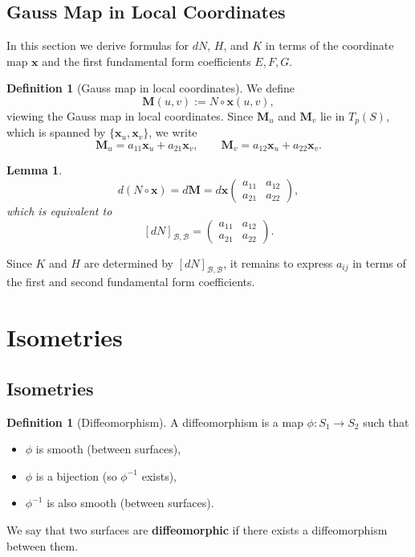 \documentclass[10pt, a4paper]{article}
\theoremstyle{plain}
\newtheorem{lemma}[theorem]{Lemma}
\theoremstyle{definition}
\newtheorem{definition}[theorem]{Definition}
\theoremstyle{remark}
\begin{document}
\subsection{Gauss Map in Local Coordinates}

In this section we derive formulas for $dN$, $H$, and $K$ in terms of the coordinate map
$\mathbf{x}$ and the first fundamental form coefficients $E, F, G$.

\begin{definition}[Gauss map in local coordinates]
  We define
  \[
    \mathbf{M}(u,v) := N \circ \mathbf{x}(u,v),
  \]
  viewing the Gauss map in local coordinates. Since $\mathbf{M}_u$ and $\mathbf{M}_v$ lie
  in $T_p(S)$, which is spanned by $\{\mathbf{x}_u, \mathbf{x}_v\}$, we write
  \[
    \mathbf{M}_u = a_{11}\mathbf{x}_u + a_{21}\mathbf{x}_v, \qquad
    \mathbf{M}_v = a_{12}\mathbf{x}_u + a_{22}\mathbf{x}_v.
  \]
\end{definition}

\begin{lemma}
  \[
    d(N \circ \mathbf{x}) = d\mathbf{M}
    = d\mathbf{x} \begin{pmatrix} a_{11} & a_{12} \\ a_{21} & a_{22} \end{pmatrix},
  \]
  which is equivalent to
  \[
    [dN]_{\mathcal{B},\mathcal{B}} = \begin{pmatrix} a_{11} & a_{12} \\ a_{21} & a_{22} \end{pmatrix}.
  \]
\end{lemma}

Since $K$ and $H$ are determined by $[dN]_{\mathcal{B},\mathcal{B}}$, it remains to express
$a_{ij}$ in terms of the first and second fundamental form coefficients.




\pagebreak

\section{Isometries}
\subsection{Isometries}

\begin{definition}[Diffeomorphism]
  A diffeomorphism is a map $\phi: S_1 \to S_2$ such that
  \begin{itemize}
    \item $\phi$ is smooth (between surfaces),
    \item $\phi$ is a bijection (so $\phi^{-1}$ exists),
    \item $\phi^{-1}$ is also smooth (between surfaces).
  \end{itemize}
  We say that two surfaces are \textbf{diffeomorphic} if there exists a diffeomorphism between them.
\end{definition}
\end{document}
